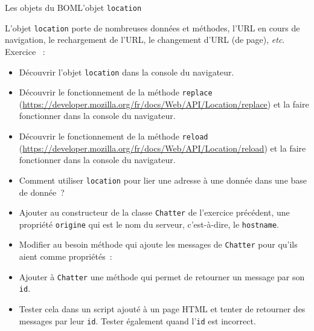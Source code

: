 \documentclass{beamer}
\begin{document}
    \begin{frame}{Les objets du BOM}{L'objet \lstinline{location}}
        \begin{tiny}
            L'objet \lstinline{location} porte de nombreuses données et méthodes, l'URL en cours de navigation, le rechargement de l'URL, le changement d'URL (de page), \textit{etc}.
            \bigbreak
            Exercice \execcounterdispinc{}~:
            \begin{itemize}
                \item Découvrir l'objet \lstinline{location} dans la console du navigateur.
                \item Découvrir le fonctionnement de la méthode \lstinline{replace} (\url{https://developer.mozilla.org/fr/docs/Web/API/Location/replace}) et la faire fonctionner dans la console du navigateur.
                \item Découvrir le fonctionnement de la méthode \lstinline{reload} (\url{https://developer.mozilla.org/fr/docs/Web/API/Location/reload}) et la faire fonctionner dans la console du navigateur.
                \item Comment utiliser \lstinline{location} pour lier une adresse à une donnée dans une base de donnée~?
                \item Ajouter au constructeur de la classe \lstinline{Chatter} de l'exercice précédent, une propriété \lstinline{origine} qui est le nom du serveur, c'est-à-dire, le \lstinline{hostname}.
                \item Modifier au besoin méthode qui ajoute les messages de \lstinline{Chatter} pour qu'ils aient comme propriétés~:
                \begin{itemize}
                \end{itemize}
                \item Ajouter à \lstinline{Chatter} une méthode qui permet de retourner un message par son \lstinline{id}.
                \item Tester cela dans un script ajouté à un page HTML et tenter de retourner des messages par leur \lstinline{id}.
                Tester également quand l'\lstinline{id} est incorrect.
            \end{itemize}
        \end{tiny}
    \end{frame}
\end{document}

